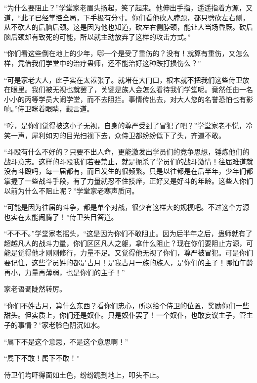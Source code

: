 
\begin{this_body}



“为什么要阻止？”学堂家老眉头扬起，笑了起来。他伸出手指，遥遥指着方源，又道，“此子已经掌控全局，下手极有分寸。你们看他砍人脖颈，都只劈砍左右侧，从不砍人的后脑后颈。这是因为他也知道，砍左右侧脖颈，能让人当场昏厥。砍后脑后颈却有致死的可能，所以就主动放弃了这样的攻击方式。”

“你们看这些倒在地上的少年，哪一个是受了重伤的？没有！就算有重伤，又怎么样，凭借我们学堂中的治疗蛊师，还不能治好这种跌打损伤么？”

“可是家老大人，此子实在太嚣张了。就堵在大门口，根本就不把我们这些侍卫放在眼里。我们被无视也就罢了，关键是族人会怎么看待我们学堂呢。竟然任由一名小小的丙等学员大闹学堂，而不去阻拦。事情传出去，对大人您的名誉恐怕也有影响。”侍卫眯着眼睛，觐言道。

“哼，是你们觉得被这小子无视，自身的尊严受到了冒犯了吧？”学堂家老不悦，冷笑一声，犀利如刃的目光扫视下去，众侍卫都纷纷低下了头，齐道不敢。

“斗殴有什么不好的？只要不出人命，更能激发出学员们的竞争思想，锤炼他们的战斗意志。这样的斗殴我们若要禁止，就是扼杀了学员们的战斗激情！往届难道就没有斗殴吗，每一届都有，而且发生的很频繁。只是以往都是在后半年，少年们都掌握了一些战斗手段，有了力量就忍不住技痒，正好又是好斗的年龄。这些人你们以前为什么不阻止呢？”学堂家老寒声质问。

“可能是因为往届的斗争，都是单个对战，很少有这样大的规模吧。不过这个方源也实在太能闹腾了！”侍卫头目答道。

“不不不。”学堂家老摇头，“这是因为你们不敢阻止。因为后半年之后，蛊师就有了超越凡人的战斗力量，你们区区凡人之躯，拿什么阻止？现在你们要阻止方源，可能是觉得他才刚刚修行，力量不足。又觉得他无视了你们，尊严被冒犯。可是你们要记住，这些学员姓的都是古月！是我古月一族的族人，是你们的主子！哪怕年龄再小，力量再薄弱，也是你们的主子！”

家老语调陡然转厉。

“你们不姓古月，算什么东西？看你们忠心，所以给个侍卫的位置，奖励你们一些甜头。但实质上，你们还是奴仆。只是奴仆罢了！一个奴仆，也敢妄议主子，管主子的事情？”家老脸色阴沉如水。

“属下不是这个意思，不是这个意思啊！”

“属下不敢！属下不敢！”

侍卫们均吓得面如土色，纷纷跪到地上，叩头不止。


\end{this_body}
